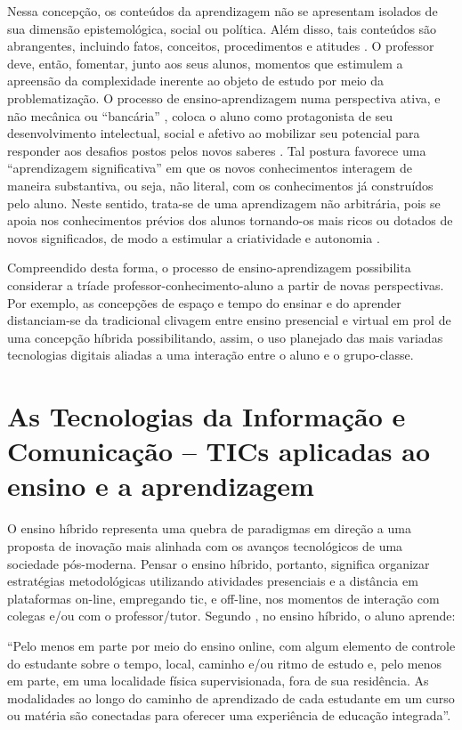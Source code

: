 \documentclass[
	12pt,				%
	openright,			%
  oneside,     %
	a4paper,			%
 hyphens,
	chapter=TITLE,		%
	english,			%
	french,				%
	spanish,			%
	brazil				%
	]{abntex2}
\begin{document}
Nessa concepção, os conteúdos da aprendizagem não se apresentam isolados de sua dimensão epistemológica, social ou política. Além disso, tais conteúdos são abrangentes, incluindo fatos, conceitos, procedimentos e atitudes \cite{zabala1988pratica}. O professor deve, então, fomentar, junto aos seus alunos, momentos que estimulem a apreensão da complexidade inerente ao objeto de estudo por meio da problematização. O processo de ensino-aprendizagem numa perspectiva ativa, e não mecânica ou “bancária” \cite{freire2014pedagogia}, coloca o aluno como protagonista de seu desenvolvimento intelectual, social e afetivo ao mobilizar seu potencial para responder aos desafios postos pelos novos saberes \cite{berbel2019metodologias}. Tal postura favorece uma “aprendizagem significativa” em que os novos conhecimentos interagem de maneira substantiva, ou seja, não literal, com os conhecimentos já construídos pelo aluno. Neste sentido, trata-se de uma aprendizagem não arbitrária, pois se apoia nos conhecimentos prévios dos alunos tornando-os mais ricos ou dotados de novos significados, de modo a estimular a criatividade e autonomia \cite{moreira2010aprendizagemsignificativa}.

Compreendido desta forma, o processo de ensino-aprendizagem possibilita considerar a tríade professor-conhecimento-aluno a partir de novas perspectivas. Por exemplo, as concepções de espaço e tempo do ensinar e do aprender distanciam-se da tradicional clivagem entre ensino presencial e virtual em prol de uma concepção híbrida possibilitando, assim, o uso planejado das mais variadas tecnologias digitais aliadas a uma interação entre o aluno e o grupo-classe.

\section{As Tecnologias da Informação e Comunicação – TICs aplicadas ao ensino e a aprendizagem}

O ensino híbrido representa uma quebra de paradigmas em direção a uma proposta de inovação mais alinhada com os avanços tecnológicos de uma sociedade pós-moderna. Pensar o ensino híbrido, portanto, significa organizar estratégias metodológicas utilizando atividades presenciais e a distância em plataformas on-line, empregando \acrshort{tic}, e off-line, nos momentos de interação com colegas e/ou com o professor/tutor. Segundo \cite{christensen2013ensino}, no ensino híbrido, o aluno aprende:

\begin{citacao}
    “Pelo menos em parte por meio do ensino online, com algum elemento de controle do estudante sobre o tempo, local, caminho e/ou ritmo de estudo e, pelo menos em parte, em uma localidade física supervisionada, fora de sua residência. As modalidades ao longo do caminho de aprendizado de cada estudante em um curso ou matéria são conectadas para oferecer uma experiência de educação integrada”.
\end{citacao}
\end{document}
